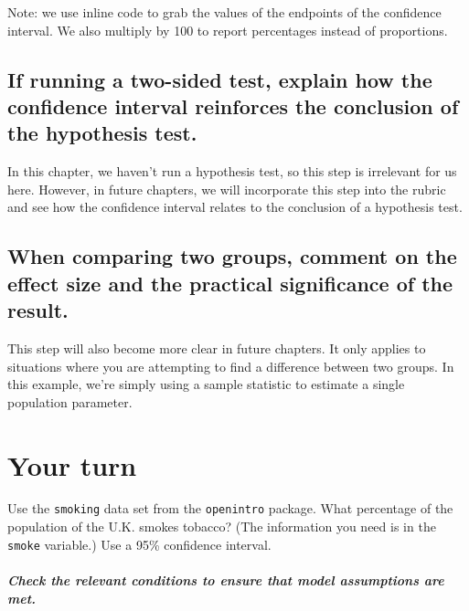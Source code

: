\documentclass[
]{book}
\begin{document}
Note: we use inline code to grab the values of the endpoints of the confidence interval. We also multiply by 100 to report percentages instead of proportions.

\hypertarget{ci-ex-ci-ht}{%
\subsection{If running a two-sided test, explain how the confidence interval reinforces the conclusion of the hypothesis test.}\label{ci-ex-ci-ht}}

In this chapter, we haven't run a hypothesis test, so this step is irrelevant for us here. However, in future chapters, we will incorporate this step into the rubric and see how the confidence interval relates to the conclusion of a hypothesis test.

\hypertarget{ci-ex-effect}{%
\subsection{When comparing two groups, comment on the effect size and the practical significance of the result.}\label{ci-ex-effect}}

This step will also become more clear in future chapters. It only applies to situations where you are attempting to find a difference between two groups. In this example, we're simply using a sample statistic to estimate a single population parameter.

\hypertarget{ci-your-turn}{%
\section{Your turn}\label{ci-your-turn}}

Use the \texttt{smoking} data set from the \texttt{openintro} package. What percentage of the population of the U.K. smokes tobacco? (The information you need is in the \texttt{smoke} variable.) Use a 95\% confidence interval.

\hypertarget{check-the-relevant-conditions-to-ensure-that-model-assumptions-are-met.-2}{%
\subparagraph*{Check the relevant conditions to ensure that model assumptions are met.}\label{check-the-relevant-conditions-to-ensure-that-model-assumptions-are-met.-2}}
\end{document}
